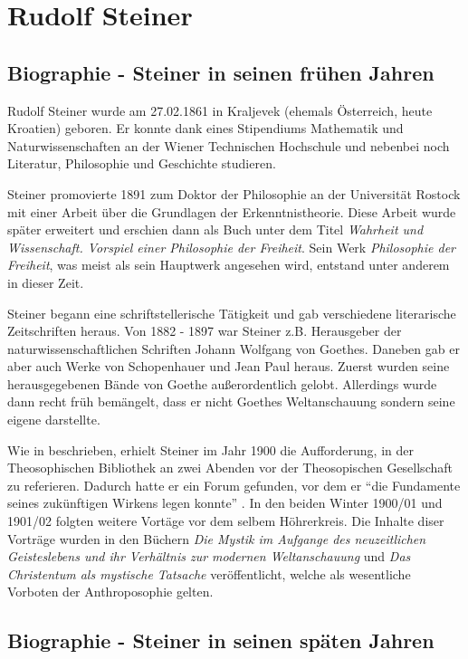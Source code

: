 \section{Rudolf Steiner}
\subsection{Biographie - Steiner in seinen frühen Jahren}
Rudolf Steiner wurde am 27.02.1861 in Kraljevek (ehemals Österreich, heute Kroatien) geboren. Er konnte dank eines Stipendiums Mathematik und Naturwissenschaften an der Wiener Technischen Hochschule und nebenbei noch Literatur, Philosophie und Geschichte studieren. \citep[Vgl.][]{wikipedia}

Steiner promovierte 1891 zum Doktor der Philosophie an der Universität Rostock mit einer Arbeit über die Grundlagen der Erkenntnistheorie. Diese Arbeit wurde später erweitert und erschien dann als Buch unter dem Titel \emph{Wahrheit und Wissenschaft. Vorspiel einer Philosophie der Freiheit}. Sein Werk \emph{Philosophie der Freiheit}, was meist als sein Hauptwerk angesehen wird, entstand unter anderem in dieser Zeit. \citep[Vgl.][]{steiner}

Steiner begann eine schriftstellerische Tätigkeit und gab verschiedene literarische Zeitschriften heraus. Von 1882 - 1897 war Steiner z.B. Herausgeber der naturwissenschaftlichen Schriften Johann Wolfgang von Goethes. Daneben gab er aber auch Werke von Schopenhauer und Jean Paul heraus. Zuerst wurden seine herausgegebenen Bände von Goethe außerordentlich gelobt. Allerdings wurde dann recht früh bemängelt, dass er nicht Goethes Weltanschauung sondern seine eigene darstellte. \citep[Vgl.][]{steiner, wikipedia}

Wie in \citet{hemleben63} beschrieben, erhielt Steiner im Jahr 1900 die Aufforderung, in der Theosophischen Bibliothek an zwei Abenden vor der Theosopischen Gesellschaft zu referieren. Dadurch hatte er ein Forum gefunden, vor dem er \enquote{die Fundamente seines zukünftigen Wirkens legen konnte} . In den beiden Winter 1900/01 und 1901/02 folgten weitere Vortäge vor dem selbem Höhrerkreis. Die Inhalte diser Vorträge wurden in den Büchern \emph{Die Mystik im Aufgange des neuzeitlichen Geisteslebens und ihr Verhältnis zur modernen Weltanschauung} und \emph{Das Christentum als mystische Tatsache} veröffentlicht, welche als wesentliche Vorboten der Anthroposophie gelten.

\subsection{Biographie - Steiner in seinen späten Jahren} %
\label{sub:biographie_steiner_in_seinen_sp_ten_jahren}

